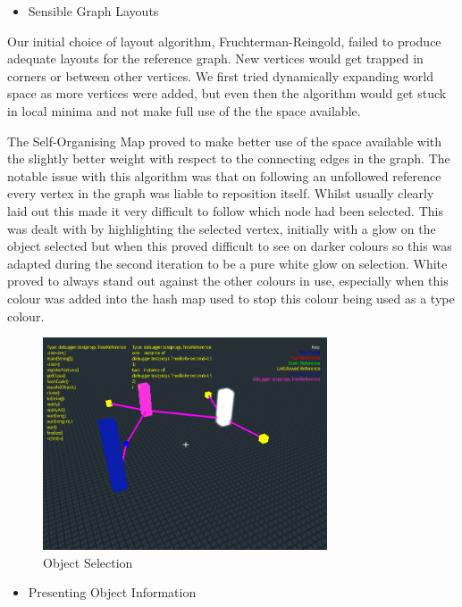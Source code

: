 \documentclass[11pt, a4paper]{report}
\begin{document}
\begin{itemize}
  \item Sensible Graph Layouts
\end{itemize}

Our initial choice of layout algorithm, Fruchterman-Reingold, failed to produce adequate layouts for the reference graph. New vertices would get trapped in corners or between other vertices. We first tried dynamically expanding world space as more vertices were added, but even then the algorithm would get stuck in local minima and not make full use of the the space available. 

The Self-Organising Map proved to make better use of the space available with the slightly better weight with respect to the connecting edges in the graph. The notable issue with this algorithm was that on following an unfollowed reference every vertex in the graph was liable to reposition itself. Whilst usually clearly laid out this made it very difficult to follow which node had been selected. This was dealt with by highlighting the selected vertex, initially with a glow on the object selected but when this proved difficult to see on darker colours so this was adapted during the second iteration to be a pure white glow on selection. White proved to always stand out against the other colours in use, especially when this colour was added into the hash map used to stop this colour being used as a type colour.

\begin{figure}[h]
        \centering
        \includegraphics[width=0.75\textwidth]{images/final/objectselect.png}
        \caption{Object Selection}
\end{figure}

\begin{itemize}
  \item Presenting Object Information
\end{itemize}
\end{document}
